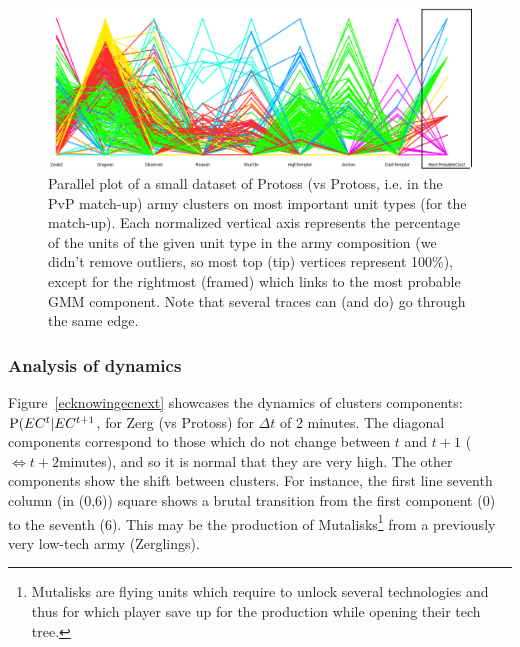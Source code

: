 \begin{figure}[h]
\centerline{\includegraphics[width=1.16\columnwidth]{images/PvP_small.png}}
\caption{Parallel plot of a small dataset of Protoss (vs Protoss, i.e. in the PvP match-up) army clusters on most important unit types (for the match-up). Each normalized vertical axis represents the percentage of the units of the given unit type in the army composition (we didn't remove outliers, so most top (tip) vertices represent 100\%), except for the rightmost (framed) which links to the most probable GMM component. Note that several traces can (and do) go through the same edge.}
\label{fig:parallelplot}
\end{figure}

\subsubsection{Analysis of dynamics}

Figure~\ref{ecknowingecnext} showcases the dynamics of clusters components: $\mathrm{P}(EC^t|EC^{t+1}$, for Zerg (vs Protoss) for $\Delta t$ of 2 minutes. The diagonal components correspond to those which do not change between $t$ and $t+1$ ($\Leftrightarrow t+2$minutes), and so it is normal that they are very high. The other components show the shift between clusters. For instance, the first line seventh column (in (0,6)) square shows a brutal transition from the first component (0) to the seventh (6). This may be the production of Mutalisks\footnote{Mutalisks are flying units which require to unlock several technologies and thus for which player save up for the production while opening their tech tree.} from a previously very low-tech army (Zerglings).

